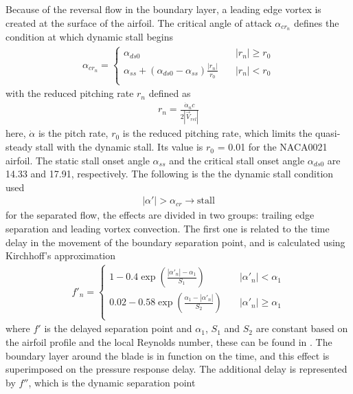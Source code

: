 \documentclass[a4paper]{jpconf}
\begin{document}
Because of the reversal flow in the boundary layer, a leading edge vortex is created at the surface of the airfoil. The critical angle of attack $\alpha_{cr_n}$ defines the condition at which dynamic stall begins
\begin{align}
\alpha_{cr_n} =
\begin{cases}
    \alpha_{ds0}       & \quad |r_n| \geqslant r_0 \\
    \alpha_{ss} + (\alpha_{ds0} - \alpha_{ss}) \frac{| r_n |}{r_0}       & \quad |r_n| < r_0 \\
\end{cases}		\label{criticalpha}
\end{align}
with the reduced pitching rate $r_n$ defined as
\begin{align}
r_n = \frac{\dot{\alpha}_n c}{ 2 | \vec{V}_{rel} | }
\end{align}
here, $\dot{\alpha}$ is the pitch rate, $r_0$ is the reduced pitching rate, which limits the quasi-steady stall with the dynamic stall. Its value is $r_0$ = 0.01 for the NACA0021 airfoil. The static stall onset angle $\alpha_{ss}$ and the critical stall onset angle $\alpha_{ds0}$ are 14.33 and 17.91, respectively. The following is the the dynamic stall condition used
\begin{align}
| \alpha ' | > \alpha_{cr} \rightarrow \mathrm{stall} \label{stall}
\end{align}
for the separated flow, the effects are divided in two groups: trailing edge separation and leading vortex convection. The first one is related to the time delay in the movement of the boundary separation point, and is calculated using Kirchhoff's approximation  
\begin{align}
f'_n =
\begin{cases}
    1- 0.4 \exp \left( \frac{|\alpha'_n| - \alpha_1 }{S_1}   \right)    & \quad |\alpha'_n| <  \alpha_1 \\
    0.02- 0.58 \exp \left( \frac{\alpha_1 - |\alpha'_n| }{S_2} \right)  & \quad |\alpha'_n| \geqslant  \alpha_1 \\
\end{cases}		\label{criticalpha2}
\end{align}
where $f'$ is the delayed separation point and $\alpha_1$, $S_1$ and $S_2$ are constant based on the airfoil profile and the local Reynolds number, these can be found in \cite{dyachuk2013dynamic}. The boundary layer around the blade is in function on the time, and this effect is superimposed on the pressure response delay. The additional delay is represented by $f''$, which is the dynamic separation point
\end{document}
